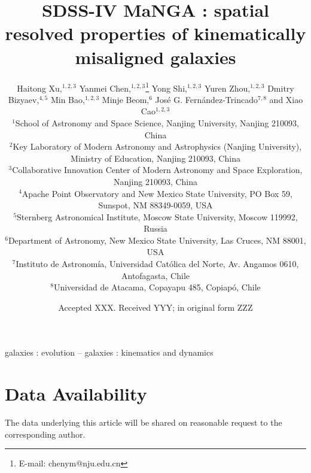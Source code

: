 \documentclass[fleqn,usenatbib]{mnras}
\title[MaNGA:properties of misaligned galaxies]{SDSS-IV MaNGA : spatial resolved properties of kinematically misaligned galaxies}
\author[Xu et al.]{\raggedright
Haitong Xu,$^{1,2,3}$
Yanmei Chen,$^{1,2,3}$\thanks{E-mail: chenym@nju.edu.cn}
Yong Shi,$^{1,2,3}$
Yuren Zhou,$^{1,2,3}$
Dmitry Bizyaev,$^{4,5}$
Min Bao,$^{1,2,3}$
\newauthor
Minje Beom,$^{6}$
Jos\'e G. Fern\'andez-Trincado$^{7,8}$ and
Xiao Cao$^{1,2,3}$
\\
$^{1}$School of Astronomy and Space Science, Nanjing University, Nanjing 210093, China\\
$^{2}$Key Laboratory of Modern Astronomy and Astrophysics (Nanjing University), Ministry of Education, Nanjing 210093, China\\
$^{3}$Collaborative Innovation Center of Modern Astronomy and Space Exploration, Nanjing 210093, China\\
$^{4}$Apache Point Observatory and New Mexico State University, PO Box 59, Sunspot, NM 88349-0059, USA\\
$^{5}$Sternberg Astronomical Institute, Moscow State University, Moscow 119992, Russia\\
$^{6}$Department of Astronomy, New Mexico State University, Las Cruces, NM 88001, USA\\
$^{7}$Instituto de Astronom\'ia, Universidad Cat\'olica del Norte, Av. Angamos 0610, Antofagasta, Chile\\
$^{8}$Universidad de Atacama, Copayapu 485, Copiap\'o, Chile
}
\date{Accepted XXX. Received YYY; in original form ZZZ}
\begin{document}
\label{firstpage}
\pagerange{\pageref{firstpage}--\pageref{lastpage}}
\maketitle



\begin{keywords}
galaxies : evolution -- galaxies : kinematics and dynamics
\end{keywords}









 



\section*{Data Availability}
The data underlying this article will be shared on reasonable request to the corresponding author.



\bsp	%
\label{lastpage}
\end{document}
